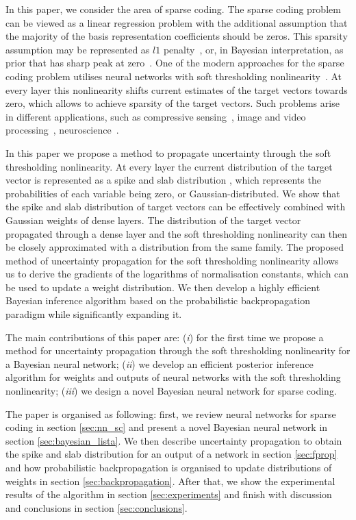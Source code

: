 \documentclass{article}
\begin{document}
In this paper, we consider the area of sparse coding. The sparse coding problem can be viewed as a linear regression problem with the additional assumption that the majority of the basis representation coefficients should be zeros. This sparsity assumption may be represented as $l1$ penalty~\cite{tibshirani1996regression}, or, in Bayesian interpretation, as prior that has sharp peak at zero~\cite{tipping2001sparse}. One of the modern approaches for the sparse coding problem utilises neural networks with soft thresholding nonlinearity~\cite{gregor2010learning, sprechmann2015learning}. At every layer this nonlinearity shifts current estimates of the target vectors towards zero, which allows to achieve sparsity of the target vectors. Such problems arise in different applications, such as compressive sensing~\cite{candes2008introduction}, image and video processing~\cite{mairal2014sparse, wang2015deep}, neuroscience~\cite{baillet1997bayesian, jas2017learning}.

In this paper we propose a method to propagate uncertainty through the soft thresholding nonlinearity. At every layer the current distribution of the target vector is represented as a spike and slab distribution \cite{mitchell1988bayesian}, which represents the probabilities of each variable being zero, or Gaussian-distributed. We show that the spike and slab distribution of target vectors can be effectively combined with Gaussian weights of dense layers. The distribution of the target vector propagated through a dense layer and the soft thresholding nonlinearity can then be closely approximated with a distribution from the same family. The proposed method of uncertainty propagation for the soft thresholding nonlinearity allows us to derive the gradients of the logarithms of normalisation constants, which can be used to update a weight distribution. We then develop a highly efficient Bayesian inference algorithm based on the probabilistic backpropagation paradigm while significantly expanding it.

The main contributions of this paper are: (\textit{i}) for the first time we propose a method for uncertainty propagation through the soft thresholding nonlinearity for a Bayesian neural network; (\textit{ii}) we develop an efficient posterior inference algorithm for weights and outputs of neural networks with the soft thresholding nonlinearity; (\textit{iii}) we design a novel Bayesian neural network for sparse coding.

The paper is organised as following: first, we review neural networks for sparse coding in section \ref{sec:nn_sc} and present a novel Bayesian neural network in section \ref{sec:bayesian_lista}. We then describe uncertainty propagation to obtain the spike and slab distribution for an output of a network in section \ref{sec:fprop} and how probabilistic backpropagation is organised to update distributions of weights in section \ref{sec:backpropagation}. After that, we show the experimental results of the algorithm in section \ref{sec:experiments} and finish with discussion and conclusions in section \ref{sec:conclusions}.
\end{document}
